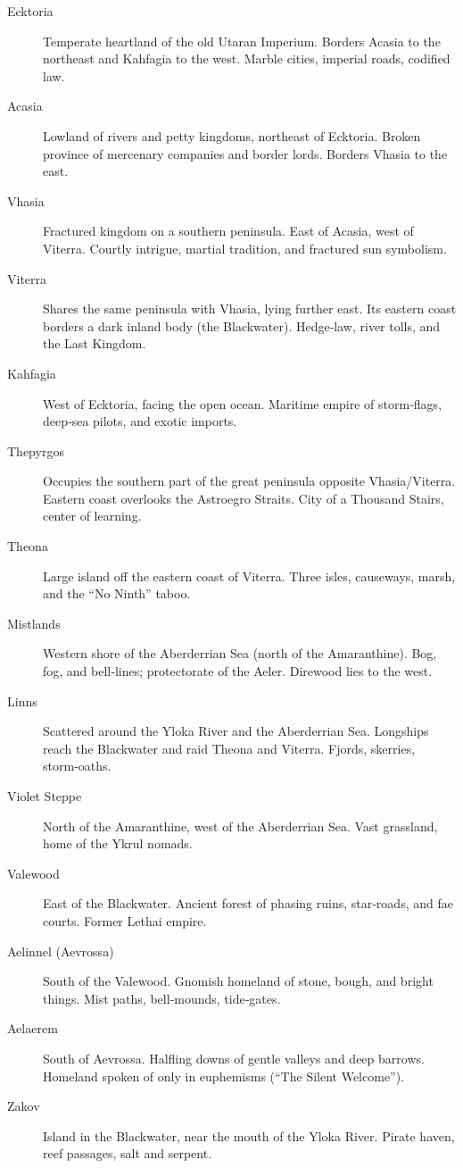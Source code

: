\begin{description}
  \item[Ecktoria]  Temperate heartland of the old Utaran Imperium. Borders Acasia to the northeast and Kahfagia to the west. Marble cities, imperial roads, codified law.
  \item[Acasia]  Lowland of rivers and petty kingdoms, northeast of Ecktoria. Broken province of mercenary companies and border lords. Borders Vhasia to the east.
  \item[Vhasia]  Fractured kingdom on a southern peninsula. East of Acasia, west of Viterra. Courtly intrigue, martial tradition, and fractured sun symbolism.
  \item[Viterra]  Shares the same peninsula with Vhasia, lying further east. Its eastern coast borders a dark inland body (the Blackwater). Hedge‑law, river tolls, and the Last Kingdom.
  \item[Kahfagia]  West of Ecktoria, facing the open ocean. Maritime empire of storm‑flags, deep‑sea pilots, and exotic imports.
  \item[Thepyrgos]  Occupies the southern part of the great peninsula opposite Vhasia/Viterra. Eastern coast overlooks the Astroegro Straits. City of a Thousand Stairs, center of learning.
  \item[Theona]  Large island off the eastern coast of Viterra. Three isles, causeways, marsh, and the “No Ninth” taboo.
  \item[Mistlands]  Western shore of the Aberderrian Sea (north of the Amaranthine). Bog, fog, and bell‑lines; protectorate of the Aeler. Direwood lies to the west.
  \item[Linns]  Scattered around the Yloka River and the Aberderrian Sea. Longships reach the Blackwater and raid Theona and Viterra. Fjords, skerries, storm‑oaths.
  \item[Violet Steppe]  North of the Amaranthine, west of the Aberderrian Sea. Vast grassland, home of the Ykrul nomads.
  \item[Valewood]  East of the Blackwater. Ancient forest of phasing ruins, star‑roads, and fae courts. Former Lethai empire.
  \item[Aelinnel (Aevrossa)]  South of the Valewood. Gnomish homeland of stone, bough, and bright things. Mist paths, bell‑mounds, tide‑gates.
  \item[Aelaerem]  South of Aevrossa. Halfling downs of gentle valleys and deep barrows. Homeland spoken of only in euphemisms (“The Silent Welcome”).
  \item[Zakov]  Island in the Blackwater, near the mouth of the Yloka River. Pirate haven, reef passages, salt and serpent.
\end{description}

